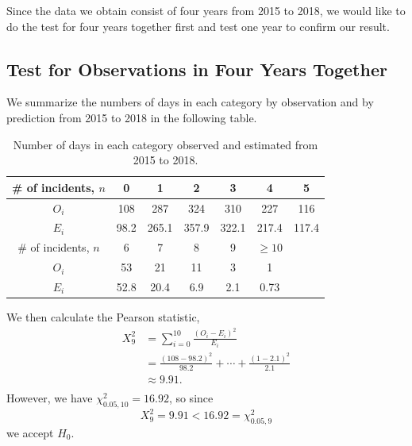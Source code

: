 \documentclass[11pt,a4paper,english]{article}
\begin{document}
Since the data we obtain consist of four years from 2015 to 2018, we would like to do the test for four years together first and test one year to confirm our result. 

\subsection{Test for Observations in Four Years Together}
We summarize the numbers of days in each category by observation and by prediction from 2015 to 2018 in the following table.
\begin{table}[htbp]
    \centering
	\begin{tabular}{c|cccccc}
		\hline
        \# of incidents, $n$ & 0 & 1 & 2 & 3 & 4 & 5 \\
		\hline
		$O_{i}$ & 108 & 287 & 324 & 310 & 227 & 116\\
		\hline
		$E_{i}$ & 98.2 & 265.1 & 357.9 & 322.1 & 217.4 & 117.4\\ 
		\hline
		\hline
		\# of incidents, $n$ & 6 & 7 & 8 & 9 & $\geq 10$ & \\
		\hline
		$O_{i}$ & 53 & 21 & 11 & 3 & 1 &\\
		\hline
		$E_{i}$  & 52.8 & 20.4 & 6.9 & 2.1 & 0.73 & \\ 
		\hline 
    \end{tabular}
	\caption{Number of days in each category observed and estimated from 2015 to 2018.}
\end{table}

We then calculate the Pearson statistic,
\[
	\begin{aligned}
		X_{9}^{2} &= \sum_{i = 0}^{10}\frac{(O_{i}-E_{i})^{2}}{E_{i}}\\
		&= \frac{(108-98.2)^{2}}{98.2}+\cdots+\frac{(1-2.1)^{2}}{2.1}\\
		&\approx 9.91.\\
	\end{aligned}
\] 
However, we have $\chi^{2}_{0.05,10} = 16.92$, so since 
\[X_{9}^{2} = 9.91 < 16.92 = \chi_{0.05,9}^{2}\]
we accept $H_{0}$.
\end{document}
